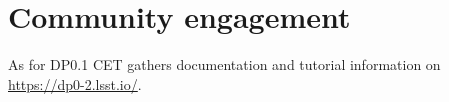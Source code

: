 \section{Community engagement} \label{sec:cet}

As for DP0.1 CET gathers documentation and tutorial information on \url{https://dp0-2.lsst.io/}.

